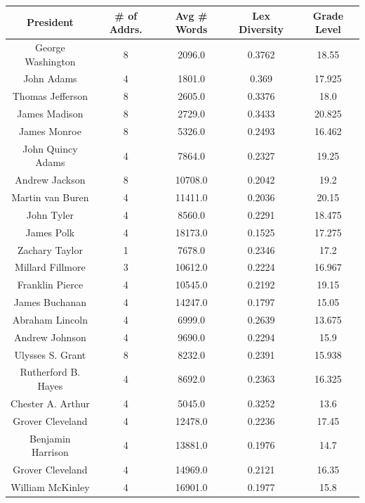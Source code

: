 \begin{singlespace}
\begin{table}[tp]
\begin{center}
 \begin{tabular}{||c | c c c c||}
 \hline
 President & \# of Addrs. & Avg \# Words & Lex Diversity & Grade Level \\
 \hline\hline
 George Washington & 8 & 2096.0 & 0.3762 & 18.55 \\ 
 \hline
 John Adams & 4 & 1801.0 & 0.369 & 17.925 \\
 \hline
 Thomas Jefferson & 8 & 2605.0 & 0.3376 & 18.0 \\
 \hline
 James Madison & 8 & 2729.0 & 0.3433 & 20.825 \\
 \hline
  James Monroe & 8 & 5326.0 & 0.2493 & 16.462 \\
 \hline
  John Quincy Adams & 4 & 7864.0 & 0.2327 & 19.25 \\
 \hline
  Andrew Jackson & 8 & 10708.0 & 0.2042 & 19.2 \\
 \hline
  Martin van Buren & 4 & 11411.0 & 0.2036 & 20.15 \\
 \hline
  John Tyler & 4 & 8560.0 & 0.2291 & 18.475 \\
 \hline
  James Polk & 4 & 18173.0 & 0.1525 & 17.275 \\
 \hline
  Zachary Taylor & 1 & 7678.0 & 0.2346 & 17.2 \\
 \hline
  Millard Fillmore & 3 & 10612.0 & 0.2224 & 16.967 \\
 \hline
  Franklin Pierce & 4 & 10545.0 & 0.2192 & 19.15 \\
 \hline
  James Buchanan & 4 & 14247.0 & 0.1797 & 15.05 \\
 \hline
  Abraham Lincoln & 4 & 6999.0 & 0.2639 & 13.675 \\
 \hline
  Andrew Johnson & 4 & 9690.0 & 0.2294 & 15.9 \\
 \hline
  Ulysses S. Grant & 8 & 8232.0 & 0.2391 & 15.938 \\
 \hline
  Rutherford B. Hayes & 4 & 8692.0 & 0.2363 & 16.325 \\
 \hline
  Chester A. Arthur & 4 & 5045.0 & 0.3252 & 13.6 \\
 \hline
  Grover Cleveland & 4 & 12478.0 & 0.2236 & 17.45 \\
 \hline
  Benjamin Harrison & 4 & 13881.0 & 0.1976 & 14.7 \\
 \hline
  Grover Cleveland & 4 & 14969.0 & 0.2121 & 16.35 \\
 \hline
  William McKinley & 4 & 16901.0 & 0.1977 & 15.8 \\

\end{tabular}
\end{center}
\end{table}
\end{singlespace}
